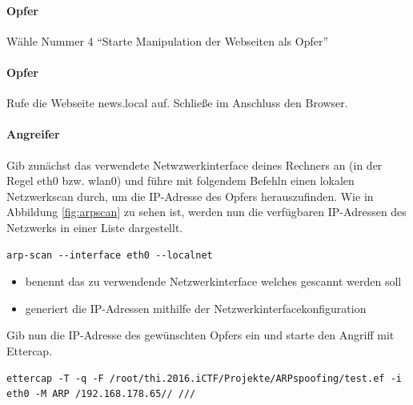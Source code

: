 \paragraph{Opfer} Wähle Nummer 4 \enquote{Starte Manipulation der Webseiten als Opfer}


\paragraph{Opfer} Rufe die Webseite news.local auf. Schließe im Anschluss den Browser.

\paragraph{Angreifer} Gib zunächst das verwendete Netwzwerkinterface deines Rechners an (in der Regel eth0 bzw. wlan0) und führe mit folgendem Befehln einen lokalen Netzwerkscan durch, um die IP-Adresse des Opfers herauszufinden. Wie in Abbildung \ref{fig:arpscan} zu sehen ist, werden nun die verfügbaren IP-Adressen des Netzwerks in einer Liste dargestellt.
\begin{lstlisting}
arp-scan --interface eth0 --localnet
\end{lstlisting}

\begin{itemize}
	\item {} benennt das zu verwendende Netzwerkinterface welches gescannt werden soll
	\item {} generiert die IP-Adressen mithilfe der Netzwerkinterfacekonfiguration
\end{itemize}

Gib nun die IP-Adresse des gewünschten Opfers ein und starte den Angriff mit Ettercap.
\begin{lstlisting}
ettercap -T -q -F /root/thi.2016.iCTF/Projekte/ARPspoofing/test.ef -i eth0 -M ARP /192.168.178.65// ///
\end{lstlisting}

